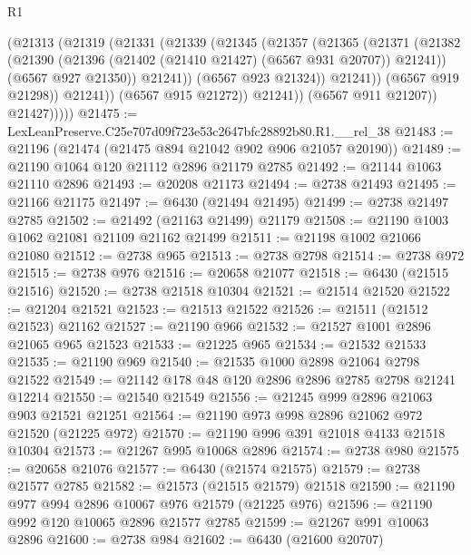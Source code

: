 \begin{lexlean}{R1}
\begin{coremodule}
                      (@21313
                        (@21319
                          (@21331
                            (@21339
                              (@21345
                                (@21357
                                  (@21365
                                    (@21371
                                      (@21382
                                        (@21390
                                          (@21396
                                            (@21402 (@21410 @21427) (@6567 @931 @20707))
                                            @21241))
                                        (@6567 @927 @21350))
                                      @21241))
                                  (@6567 @923 @21324))
                                @21241))
                            (@6567 @919 @21298))
                          @21241))
                      (@6567 @915 @21272))
                    @21241))
                (@6567 @911 @21207))
              @21427)))))
@21475 := LexLeanPreserve.C25e707d09f723e53c2647bfc28892b80.R1.__rel_38
@21483 := @21196 (@21474 (@21475 @894 @21042 @902 @906 @21057 @20190))
@21489 := @21190 @1064 @120 @21112 @2896 @21179 @2785
@21492 := @21144 @1063 @21110 @2896
@21493 := @20208 @21173
@21494 := @2738 @21493
@21495 := @21166 @21175
@21497 := @6430 (@21494 @21495)
@21499 := @2738 @21497 @2785
@21502 := @21492 (@21163 @21499) @21179
@21508 := @21190 @1003 @1062 @21081 @21109 @21162 @21499
@21511 := @21198 @1002 @21066 @21080
@21512 := @2738 @965
@21513 := @2738 @2798
@21514 := @2738 @972
@21515 := @2738 @976
@21516 := @20658 @21077
@21518 := @6430 (@21515 @21516)
@21520 := @2738 @21518 @10304
@21521 := @21514 @21520
@21522 := @21204 @21521
@21523 := @21513 @21522
@21526 := @21511 (@21512 @21523) @21162
@21527 := @21190 @966
@21532 := @21527 @1001 @2896 @21065 @965 @21523
@21533 := @21225 @965
@21534 := @21532 @21533
@21535 := @21190 @969
@21540 := @21535 @1000 @2898 @21064 @2798 @21522
@21549 := @21142 @178 @48 @120 @2896 @2896 @2785 @2798 @21241 @12214
@21550 := @21540 @21549
@21556 := @21245 @999 @2896 @21063 @903 @21521 @21251
@21564 := @21190 @973 @998 @2896 @21062 @972 @21520 (@21225 @972)
@21570 := @21190 @996 @391 @21018 @4133 @21518 @10304
@21573 := @21267 @995 @10068 @2896
@21574 := @2738 @980
@21575 := @20658 @21076
@21577 := @6430 (@21574 @21575)
@21579 := @2738 @21577 @2785
@21582 := @21573 (@21515 @21579) @21518
@21590 := @21190 @977 @994 @2896 @10067 @976 @21579 (@21225 @976)
@21596 := @21190 @992 @120 @10065 @2896 @21577 @2785
@21599 := @21267 @991 @10063 @2896
@21600 := @2738 @984
@21602 := @6430 (@21600 @20707)

\end{coremodule}
\end{lexlean}
